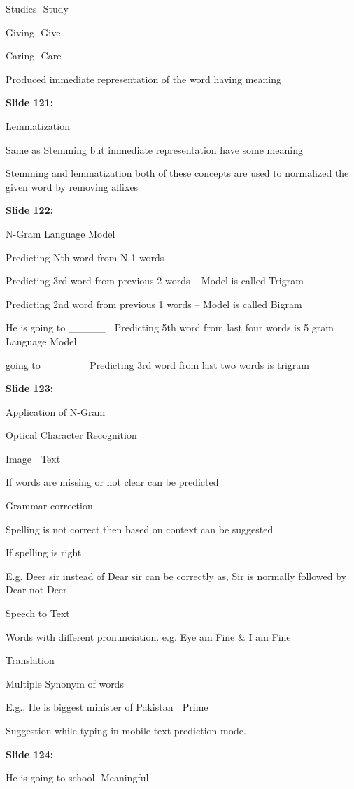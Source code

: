 \documentclass[11pt,a4paper]{article}
\begin{document}
Studies- 	 Study

Giving-   	 Give

Caring-         Care

Produced immediate representation of the word  having meaning

\textbf{Slide 121:}

Lemmatization

Same as Stemming but immediate representation have some meaning

Stemming and lemmatization both of these concepts are used to normalized the given word by removing affixes

\textbf{Slide 122:}

N-Gram Language Model

Predicting Nth    word from  N-1 words

Predicting 3rd word from previous 2 words – Model is called Trigram

Predicting 2nd word from previous 1 words – Model is called Bigram

He is going to \_\_\_\_\_      Predicting 5th word from last four words is 5 gram Language Model

going to \_\_\_\_\_     Predicting 3rd  word from last two words is trigram

\textbf{Slide 123:}

Application of N-Gram

Optical Character Recognition

Image   Text

If words are missing or not clear can be predicted

Grammar correction

Spelling is not correct then based on context can be suggested

If spelling is right

E.g. Deer sir instead of Dear sir can be correctly as, Sir is normally followed by Dear not Deer

Speech to Text

Words with different pronunciation. e.g. Eye am Fine & I am Fine

Translation

Multiple Synonym of words

E.g., He is biggest minister of Pakistan  Prime

Suggestion while typing in mobile text prediction mode.

\textbf{Slide 124:}

He is going to school Meaningful
\end{document}
